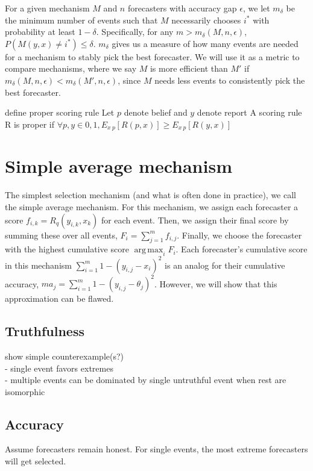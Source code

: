\documentclass[letterpaper,12pt]{article}
\DeclareMathOperator*{\argmax}{arg\,max}
\newcommand{\1}{\mathbbm{1}}
\begin{document}
For a given mechanism $M$ and $n$ forecasters with accuracy gap $\epsilon$, we let $m_\delta$ be the minimum number of events such that $M$ necessarily chooses $i^*$ with probability at least $1 - \delta$. Specifically, for any $m > m_\delta(M, n, \epsilon)$, $P(M(y, x) \neq i^*) \leq \delta$. $m_\delta$ gives us a measure of how many events are needed for a mechanism to stably pick the best forecaster. We will use it as a metric to compare mechanisms, where we say $M$ is more efficient than $M'$ if $m_\delta(M, n, \epsilon) < m_\delta(M', n, \epsilon)$, since $M$ needs less events to consistently pick the best forecaster. 

define proper scoring rule
Let $p$ denote belief and $y$ denote report
A scoring rule R is proper if $\forall p,y \in {0,1}, E_{x~p}[R(p,x)] \ge E_{x~p}[R(y,x)]$

\section{Simple average mechanism}
The simplest selection mechanism (and what is often done in practice), we call the simple average mechanism. For this mechanism, we assign each forecaster a score $f_{i, k} = R_q(y_{i, k}, x_k)$ for each event. Then, we assign their final score by summing these over all events, $F_i = \sum_{j=1}^m f_{i, j}$. Finally, we choose the forecaster with the highest cumulative score $\argmax_i F_i$. Each forecaster's cumulative score in this mechanism $\sum_{i=1}^m 1 - (y_{i, j} - x_i)^2$ is an analog for their cumulative accuracy, $m a_j = \sum_{i=1}^m 1 - (y_{i, j} - \theta_j)^2$. However, we will show that this approximation can be flawed.

\subsection{Truthfulness}
show simple counterexample(s?) \\
- single event favors extremes \\
- multiple events can be dominated by single untruthful event when rest are isomorphic \\

\subsection{Accuracy}

Assume forecasters remain honest. For single events, the most extreme forecasters will get selected. 
\end{document}
